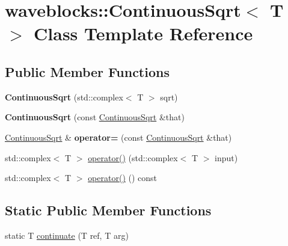 \hypertarget{classwaveblocks_1_1_continuous_sqrt}{}\section{waveblocks\+:\+:Continuous\+Sqrt$<$ T $>$ Class Template Reference}
\label{classwaveblocks_1_1_continuous_sqrt}
\subsection*{Public Member Functions}
\begin{DoxyCompactItemize}
\item 
\hypertarget{classwaveblocks_1_1_continuous_sqrt_ad08b58c3346e975e01b4390e94927b55}{}{\bfseries Continuous\+Sqrt} (std\+::complex$<$ T $>$ sqrt)\label{classwaveblocks_1_1_continuous_sqrt_ad08b58c3346e975e01b4390e94927b55}

\item 
\hypertarget{classwaveblocks_1_1_continuous_sqrt_a79180940f9256e0945da44a073fde5a1}{}{\bfseries Continuous\+Sqrt} (const \hyperlink{classwaveblocks_1_1_continuous_sqrt}{Continuous\+Sqrt} \&that)\label{classwaveblocks_1_1_continuous_sqrt_a79180940f9256e0945da44a073fde5a1}

\item 
\hypertarget{classwaveblocks_1_1_continuous_sqrt_acdea6c831155f2b39e80f6e97d9f7ff7}{}\hyperlink{classwaveblocks_1_1_continuous_sqrt}{Continuous\+Sqrt} \& {\bfseries operator=} (const \hyperlink{classwaveblocks_1_1_continuous_sqrt}{Continuous\+Sqrt} \&that)\label{classwaveblocks_1_1_continuous_sqrt_acdea6c831155f2b39e80f6e97d9f7ff7}

\item 
std\+::complex$<$ T $>$ \hyperlink{classwaveblocks_1_1_continuous_sqrt_a808fbb17ee6e12a9e8d622e32317b751}{operator()} (std\+::complex$<$ T $>$ input)
\item 
std\+::complex$<$ T $>$ \hyperlink{classwaveblocks_1_1_continuous_sqrt_a7b5e8a8ce0b658928d6b4fcc57b483b3}{operator()} () const 
\end{DoxyCompactItemize}
\subsection*{Static Public Member Functions}
\begin{DoxyCompactItemize}
\item 
static T \hyperlink{classwaveblocks_1_1_continuous_sqrt_a403d3bc15b436cee0dc977a61603c1de}{continuate} (T ref, T arg)
\end{DoxyCompactItemize}



